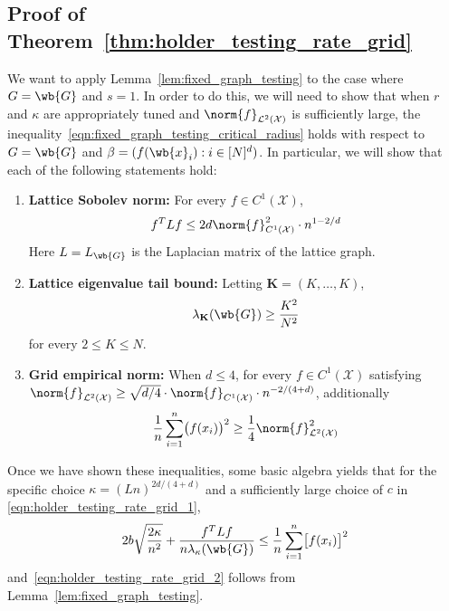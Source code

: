 \documentclass{article}
\newcommand{\1}{\mathbf{1}}
\newcommand{\Xset}{\mathcal{X}}
\newcommand{\Leb}{\mathcal{L}}
\theoremstyle{alden}
\theoremstyle{aldenthm}
\theoremstyle{definition}
\theoremstyle{remark}
\begin{document}
\subsection{Proof of Theorem~\ref{thm:holder_testing_rate_grid}}
\label{subsec:holder_testing_rate_grid_pf}

We want to apply Lemma~\ref{lem:fixed_graph_testing} to the case where $G = \wb{G}$ and $s = 1$. In order to do this, we will need to show that when $r$ and $\kappa$ are appropriately tuned and $\norm{f}_{\Leb^2(\mathcal{X})}$ is sufficiently large, the inequality~\eqref{eqn:fixed_graph_testing_critical_radius} holds with respect to $G = \wb{G}$ and $\beta = (f(\wb{x}_i): i \in [N]^d)$. In particular, we will show that each of the following statements hold:

\begin{enumerate}[label=(E\arabic*)]
	\item
	\label{event:discrete_sobolev_norm_grid}
	\textbf{Lattice Sobolev norm:}
	For every $f \in C^1(\Xset)$,
	\begin{equation}
	\label{eqn:discrete_sobolev_norm_grid}
	f^T L f \leq 2d \norm{f}_{C^1(\Xset)}^2 \cdot n^{1 - 2/d}
	\end{equation}
	Here $L = L_{\wb{G}}$ is the Laplacian matrix of the lattice graph.
	
	\item
	\label{event:eigenvalue_tail_bound_grid}
	\textbf{Lattice eigenvalue tail bound:}
	Letting $\mathbf{K} = (K,\ldots,K)$, 
	\begin{equation}
	\label{eqn:eigenvalue_tail_bound_grid}
	\lambda_{\mathbf{K}}(\wb{G}) \geq \frac{K^2}{N^2}
	\end{equation}
	for every $2 \leq K \leq N$.
	
	\item 
	\label{event:l2_to_empirical_norm_grid}
	\textbf{Grid empirical norm:}
	When $d \leq 4$, for every $f \in C^1(\Xset)$ satisfying $\norm{f}_{\Leb^2(\Xset)} \geq \sqrt{d/4} \cdot \norm{f}_{C^1(\Xset)} \cdot n^{-2/(4 + d)}$, additionally
	\begin{equation}
	\label{eqn:l2_to_empirical_norm_grid}
	\frac{1}{n}\sum_{i = 1}^{n} \bigl(f(x_i)\bigr)^2 \geq \frac{1}{4}\norm{f}_{\Leb^2(\Xset)}^2
	\end{equation}
\end{enumerate}
Once we have shown these inequalities, some basic algebra yields that for the specific choice $\kappa = (Ln)^{2d/(4 + d)}$ and a sufficiently large choice of $c$ in \eqref{eqn:holder_testing_rate_grid_1},
\begin{align*}
2b\sqrt{\frac{2\kappa}{n^2}} + \frac{f^T L f}{n\lambda_{\kappa}(\wb{G})} \leq \frac{1}{n}\sum_{i = 1}^{n}\bigl[f(x_i)\bigr]^2
\end{align*}
and~\eqref{eqn:holder_testing_rate_grid_2} follows from Lemma~\ref{lem:fixed_graph_testing}.
\end{document}
